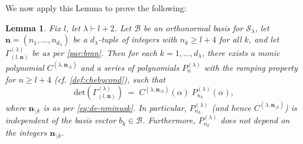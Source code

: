 \documentclass{article}
\newtheorem{lemma}[theorem]{Lemma}
\theoremstyle{definition}
\def\SS{\mathcal{S}} %
\def\BB{\mathcal{B}} %
\def\a{\alpha}
\def\l{\lambda}
\numberwithin{equation}{subsection}
\begin{document}
We now apply this Lemma to prove the following:

\begin{lemma}\label{lem:pl} Fix $l$, let $\l \vdash l+2$. Let $\BB$ be an orthonormal basis for $\SS_\l$, let $\bm{n}=(n_1,\dots, n_{d_\l})$ be a $d_\l$-tuple of integers with $n_k\geq l+4$ for all $k$, and let $\Gamma_{(l,\bm{n})}^{(\l)}$ be as per \ref{par:bmn}. Then for each $k=1,\dots, d_\l$, there exists a monic polynomial $C^{(\l,\bm{n}_{\setminus k})}$ and a series of polynomials $P^{(\l)}_{n}$ with the ramping property for $n\geq l+4$ (\textit{cf.} \ref{def:chebycond}), such that 
\[ 
\text{det}(\Gamma_{(l,\bm{n})}^{(\l)}) \;=\; C^{(\l,\bm{n}_{\setminus k})}(\a) \; P^{(\l)}_{n_k}(\a),
\]
where $\bm{n}_{\setminus k}$ is as per \eqref{eq:de-nminusk}. In particular, $P^{(\l)}_{n_k}$ (and hence $C^{(\l,\bm{n}_{\setminus k})}$) is independent of the basis vector $b_k\in \BB$. Furthermore, $P^{(\l)}_{n_k}$ does not depend on the integers $\bm{n}_{\setminus k}$.
\end{lemma}
\end{document}
